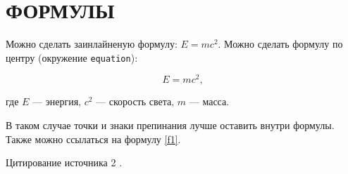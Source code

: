\section{ФОРМУЛЫ}

Можно сделать заинлайненую формулу: $E = mc^2$. Можно сделать формулу по центру (окружение \texttt{equation}):

\begin{equation}
    \label{f1}
    E = mc^2,
\end{equation}

где $E$ --- энергия, $c^2$ --- скорость света, $m$ --- масса. 

В таком случае точки и знаки препинания лучше оставить внутри формулы. Также можно ссылаться на формулу \ref{f1}.

\lipsum[3]

Цитирование источника 2 \cite{cite_1_1}.
